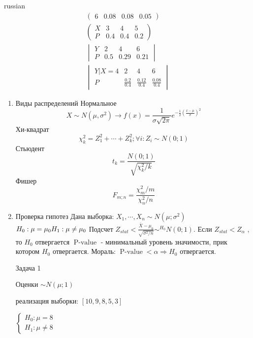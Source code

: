 \documentclass{article}
\begin{document}
\begin{otherlanguage*}{russian}
\begin{align}
\begin{pmatrix}
6 & 0.08 & 0.08 & 0.05
\end{pmatrix} \\
\begin{pmatrix}
X & 3 & 4 & 5 \\
P & 0.4 & 0.4 & 0.2
\end{pmatrix} \\
\begin{vmatrix}
Y & 2 & 4 & 6 \\
P & 0.5 & 0.29 & 0.21
\end{vmatrix} \\
\begin{vmatrix}
Y | X = 4 & 2 & 4 & 6 \\
P & \frac{0.2}{0.4} & \frac{0.12}{0.4} & \frac{0.08}{0.4}
\end{vmatrix}
\end{align}
\begin{enumerate}
\item Виды распределений
Нормальное
\begin{equation}
X \sim N(\mu, \sigma^2) \rightarrow f(x) ={\frac {1}{\sigma {\sqrt {2\pi }}}}e^{-{\frac {1}{2}}\left({\frac {x-\mu }{\sigma }}\right)^{2}}
\end{equation}
Хи-квадрат 
\begin{equation}
\chi^2_k = Z_1^2 + \cdots + Z_k^2; \forall i: Z_i \sim N(0;1) 
\end{equation}
Стьюдент 
\begin{equation}
t_k = \frac{N(0;1)}{\sqrt{\chi^2_k / k}}
\end{equation}
Фишер
\begin{equation}
F_{m;n} = \frac{\chi^2_m / m}{\chi^2_n / n}
\end{equation}
\item Проверка гипотез
Дана выборка: $X_1, \cdots, X_n \sim N(\mu; \sigma^2)$
$H_0: \mu = \mu_0 \\
H_1: \mu \ne \mu_0$ 
Подсчет $Z_{stat} < \frac{\bar{X} - \mu_0}{\sqrt{\sigma^2 / n}} \sim^{H_0} N(0;1)$.
Если $Z_{stat} < Z_{\alpha}$ , то $H_0$ отвергается
$\operatorname{P-value}$ - минимальный уровень значимости, прик котором $H_0$ отвергается.
Мораль: $\operatorname{P-value} < \alpha \Rightarrow H_0$ отвергается. 

Задача 1

Оценки $\sim N(\mu;1) $

реализация выборки: $ [10,9, 8, 5, 3]$

$\begin{cases}
H_0: \mu = 8 \\
H_1: \mu \ne 8 
\end{cases}$


\end{enumerate}
\end{otherlanguage*}
\end{document}
